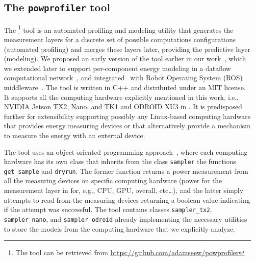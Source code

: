 \subsection{The {\tt powprofiler} tool}
\label{sec:powprof}

The \powprof{}\footnote{The tool can be retrieved from \url{https://github.com/adamseew/powprofiler}} tool is an automated profiling and modeling utility that generates the measurement layers for a discrete set of possible computations configurations (automated profiling) and merges these layers later, providing the predictive layer (modeling). We proposed an early version of the tool earlier in our work~\citep{teamplayd43,seewald2019coarse}, which we extended later to support per-component energy modeling in a dataflow computational network~\citep{seewald2019component}, and integrated~\citep{zamanakos2020energy} with Robot Operating System (ROS) middleware~\citep{quigley2009ros}. The tool is written in C++ and distributed under an MIT license. It supports all the computing hardware explicitly mentioned in this work, i.e., NVIDIA Jetson TX2, Nano, and TK1 and ODROID XU3 in . It is predisposed further for extensibility supporting possibly any Linux-based computing hardware that provides energy measuring devices or that alternatively provide a mechanism to measure the energy with an external device.

The tool uses an object-oriented programming approach~\citep{stroustrup1988what,wegner1990concepts}, where each computing hardware has its own class that inherits from the class {\small\tt sampler} the functions {\small\tt get\_sample} and {\small\tt dryrun}. The former function returns a power measurement from all the measuring devices on specific computing hardware (power for the measurement layer in  for, e.g., CPU, GPU, overall, etc\dots), and the latter simply attempts to read from the measuring devices returning a boolean value indicating if the attempt was successful. The tool contains classes {\small\tt sampler\_tx2}, {\small\tt sampler\_nano}, and {\small\tt sampler\_odroid} already implementing the necessary utilities to store the models from the computing hardware that we explicitly analyze.


